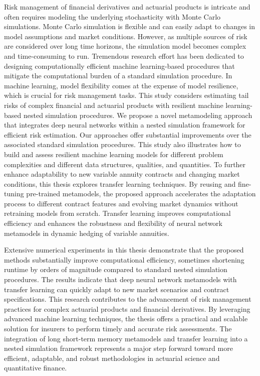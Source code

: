 Risk management of financial derivatives and actuarial products is intricate and often requires modeling the underlying stochasticity with Monte Carlo simulations.
Monte Carlo simulation is flexible and can easily adapt to changes in model assumptions and market conditions.
However, as multiple sources of risk are considered over long time horizons, the simulation model becomes complex and time-consuming to run.
Tremendous research effort has been dedicated to designing computationally efficient machine learning-based procedures that mitigate the computational burden of a standard simulation procedure.
In machine learning, model flexibility comes at the expense of model resilience, which is crucial for risk management tasks.
This study considers estimating tail risks of complex financial and actuarial products with resilient machine learning-based nested simulation procedures.
We propose a novel metamodeling approach that integrates deep neural networks within a nested simulation framework for efficient risk estimation.
Our approaches offer substantial improvements over the associated standard simulation procedures.
This study also illustrates how to build and assess resilient machine learning models for different problem complexities and different data structures, qualities, and quantities.
To further enhance adaptability to new variable annuity contracts and changing market conditions, this thesis explores transfer learning techniques.
By reusing and fine-tuning pre-trained metamodels, the proposed approach accelerates the adaptation process to different contract features and evolving market dynamics without retraining models from scratch.
Transfer learning improves computational efficiency and enhances the robustness and flexibility of neural network metamodels in dynamic hedging of variable annuities.

Extensive numerical experiments in this thesis demonstrate that the proposed methods substantially improve computational efficiency, sometimes shortening runtime by orders of magnitude compared to standard nested simulation procedures.
The results indicate that deep neural network metamodels with transfer learning can quickly adapt to new market scenarios and contract specifications.
This research contributes to the advancement of risk management practices for complex actuarial products and financial derivatives.
By leveraging advanced machine learning techniques, the thesis offers a practical and scalable solution for insurers to perform timely and accurate risk assessments.
The integration of long short-term memory metamodels and transfer learning into a nested simulation framework represents a major step forward toward more efficient, adaptable, and robust methodologies in actuarial science and quantitative finance.


